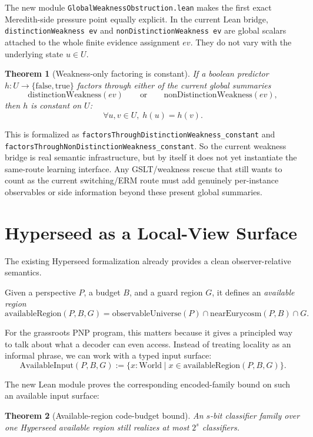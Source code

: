\documentclass[11pt]{article}
\newtheorem{theorem}{Theorem}[section]
\theoremstyle{remark}
\begin{document}
The new module \texttt{GlobalWeaknessObstruction.lean} makes the first exact
Meredith-side pressure point equally explicit.  In the current Lean bridge,
\texttt{distinctionWeakness ev} and \texttt{nonDistinctionWeakness ev} are
global scalars attached to the whole finite evidence assignment \(ev\).  They do
not vary with the underlying state \(u \in U\).

\begin{theorem}[Weakness-only factoring is constant]
If a boolean predictor \(h : U \to \{\mathrm{false},\mathrm{true}\}\) factors
through either of the current global summaries
\[
  \mathrm{distinctionWeakness}(ev)
  \qquad \text{or} \qquad
  \mathrm{nonDistinctionWeakness}(ev),
\]
then \(h\) is constant on \(U\):
\[
  \forall u,v \in U,\; h(u) = h(v).
\]
\end{theorem}

\noindent
This is formalized as
\texttt{factorsThroughDistinctionWeakness\_constant} and
\texttt{factorsThroughNonDistinctionWeakness\_constant}.  So the current
weakness bridge is real semantic infrastructure, but by itself it does not yet
instantiate the same-route learning interface.  Any GSLT/weakness rescue that
still wants to count as the current switching/ERM route must add genuinely
per-instance observables or side information beyond these present global
summaries.

\section{Hyperseed as a Local-View Surface}

The existing Hyperseed formalization already provides a clean observer-relative
semantics.

Given a perspective \(P\), a budget \(B\), and a guard region \(G\), it defines
an \emph{available region}
\[
  \mathrm{availableRegion}(P,B,G)
  =
  \mathrm{observableUniverse}(P)
  \cap
  \mathrm{nearEurycosm}(P,B)
  \cap
  G.
\]

For the grassroots PNP program, this matters because it gives a principled way to
talk about what a decoder can even access.  Instead of treating locality as an
informal phrase, we can work with a typed input surface:
\[
  \mathrm{AvailableInput}(P,B,G)
  := \{x : \mathrm{World} \mid x \in \mathrm{availableRegion}(P,B,G)\}.
\]

The new Lean module proves the corresponding encoded-family bound on such an
available input surface:

\begin{theorem}[Available-region code-budget bound]
An \(s\)-bit classifier family over one Hyperseed available region still realizes
at most \(2^s\) classifiers.
\end{theorem}
\end{document}
